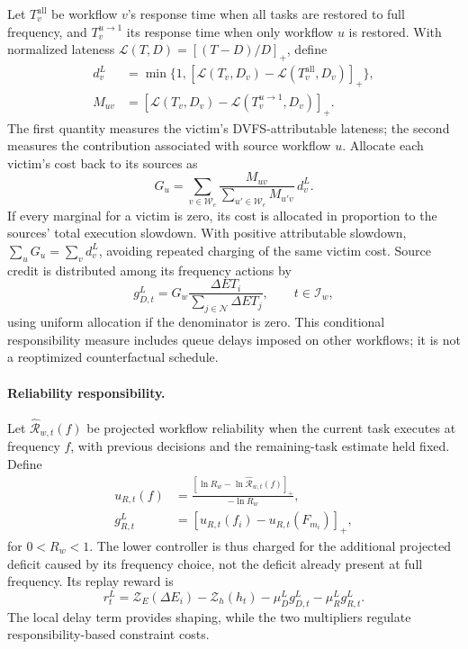 \documentclass[lettersize,journal]{IEEEtran}
\begin{document}
Let $T_v^{\mathrm{all}}$ be workflow $v$'s response time when all tasks are
restored to full frequency, and $T_v^{u\to1}$ its response time when only
workflow $u$ is restored. With normalized lateness
$\mathcal L(T,D)=[(T-D)/D]_+$, define
\begin{align}
 d_v^L&=\min\{1,[\mathcal L(T_v,D_v)-\mathcal L(T_v^{\mathrm{all}},D_v)]_+\},\nonumber\\
 M_{uv}&=[\mathcal L(T_v,D_v)-\mathcal L(T_v^{u\to1},D_v)]_+.
 \label{eq:method_counterfactual_marginal}
\end{align}
The first quantity measures the victim's DVFS-attributable lateness;
the second measures the contribution associated with source workflow
$u$. Allocate each victim's cost back to its sources as
\begin{equation}
 G_u=\sum_{v\in\mathcal W_e}
 \frac{M_{uv}}{\sum_{u'\in\mathcal W_e}M_{u'v}}\,d_v^L.
 \label{eq:method_source_credit}
\end{equation}
If every marginal for a victim is zero, its cost is allocated in
proportion to the sources' total execution slowdown. With positive
attributable slowdown, $\sum_uG_u=\sum_vd_v^L$, avoiding repeated
charging of the same victim cost. Source credit is distributed among
its frequency actions by
\begin{equation}
 g_{D,t}^L=G_w\frac{\Delta ET_i}
 {\sum_{j\in\mathcal N}\Delta ET_j},\qquad t\in\mathcal I_w,
 \label{eq:method_low_deadline_credit}
\end{equation}
using uniform allocation if the denominator is zero. This conditional
responsibility measure includes queue delays imposed on other
workflows; it is not a reoptimized counterfactual schedule.

\paragraph{Reliability responsibility.}
Let $\widehat{\mathcal R}_{w,t}(f)$ be projected workflow reliability
when the current task executes at frequency $f$, with previous decisions and the
remaining-task estimate held fixed. Define
\begin{align}
 u_{R,t}(f)&=
 \frac{[\ln R_w-\ln\widehat{\mathcal R}_{w,t}(f)]_+}{-\ln R_w},\nonumber\\
 g_{R,t}^L&=[u_{R,t}(f_i)-u_{R,t}(F_{m_i})]_+,
 \label{eq:method_low_reliability}
\end{align}
for $0<R_w<1$. The lower controller is thus charged for the additional
projected deficit caused by its frequency choice, not the deficit
already present at full frequency. Its replay reward is
\begin{equation}
 r_t^L=\mathcal Z_E(\Delta E_i)-\mathcal Z_h(h_t)
 -\mu_D^L g_{D,t}^L-\mu_R^L g_{R,t}^L.
 \label{eq:method_low_reward}
\end{equation}
The local delay term provides shaping, while the two multipliers
regulate responsibility-based constraint costs.
\end{document}
